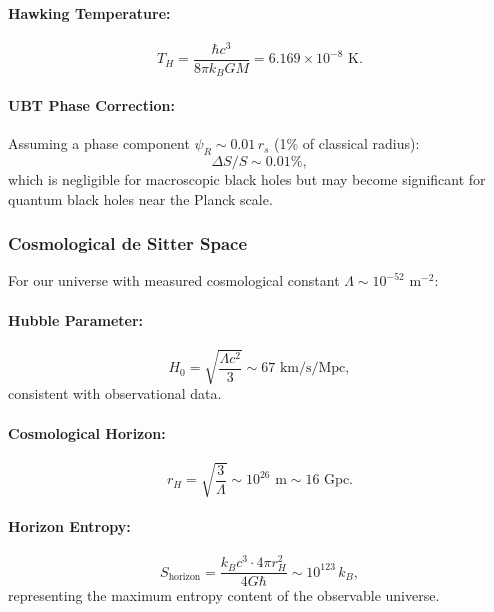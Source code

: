 \paragraph{Hawking Temperature:}
\begin{equation}
T_H = \frac{\hbar c^3}{8\pi k_B G M} = 6.169 \times 10^{-8} \text{ K}.
\end{equation}

\paragraph{UBT Phase Correction:}
Assuming a phase component $\psi_R \sim 0.01 \, r_s$ (1\% of classical radius):
\begin{equation}
\Delta S / S \sim 0.01\%,
\end{equation}
which is negligible for macroscopic black holes but may become significant for quantum black holes near the Planck scale.

\subsubsection{Cosmological de Sitter Space}

For our universe with measured cosmological constant $\Lambda \sim 10^{-52} \text{ m}^{-2}$:

\paragraph{Hubble Parameter:}
\begin{equation}
H_0 = \sqrt{\frac{\Lambda c^2}{3}} \sim 67 \text{ km/s/Mpc},
\end{equation}
consistent with observational data.

\paragraph{Cosmological Horizon:}
\begin{equation}
r_H = \sqrt{\frac{3}{\Lambda}} \sim 10^{26} \text{ m} \sim 16 \text{ Gpc}.
\end{equation}

\paragraph{Horizon Entropy:}
\begin{equation}
S_{\text{horizon}} = \frac{k_B c^3 \cdot 4\pi r_H^2}{4G\hbar} \sim 10^{123} \, k_B,
\end{equation}
representing the maximum entropy content of the observable universe.

